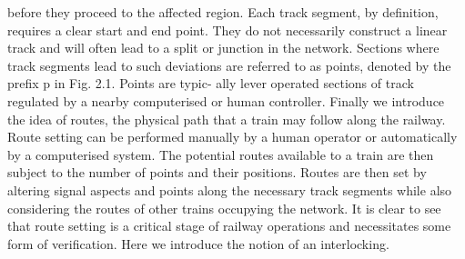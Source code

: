 \documentclass[runningheads]{llncs}
\begin{document}
before they proceed to the affected region. Each track segment, by definition, requires a
clear start and end point. They do not necessarily construct a linear track and will often
lead to a split or junction in the network. Sections where track segments lead to such
deviations are referred to as points, denoted by the prefix p in Fig. 2.1. Points are typic-
ally lever operated sections of track regulated by a nearby computerised or human controller.
Finally we introduce the idea of routes, the physical path that a train may follow
along the railway. Route setting can be performed manually by a human operator or
automatically by a computerised system. The potential routes available to a train are then
subject to the number of points and their positions. Routes are then set by altering signal
aspects and points along the necessary track segments while also considering the routes
of other trains occupying the network. It is clear to see that route setting is a critical stage
of railway operations and necessitates some form of verification. Here we introduce the
notion of an interlocking.
\end{document}
